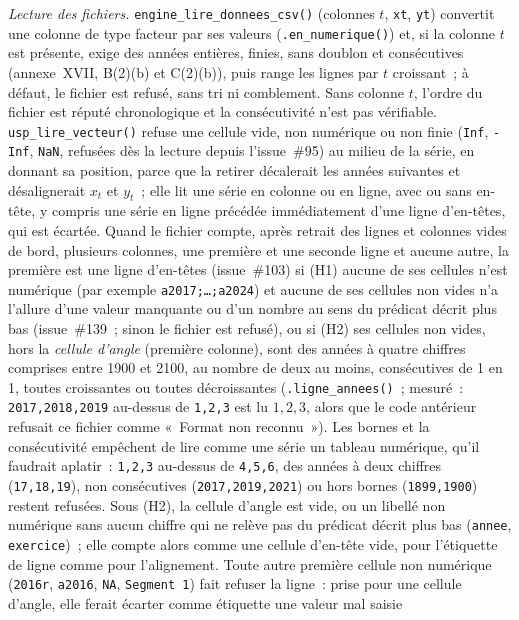 \documentclass[a4paper,11pt]{article}
\newcommand{\code}[1]{\texttt{\small #1}}
\begin{document}
\emph{Lecture des fichiers.} \code{engine\_lire\_donnees\_csv()} (colonnes $t$, \code{xt},
\code{yt}) convertit une colonne de type facteur par ses valeurs (\code{.en\_numerique()}) et,
si la colonne $t$ est présente, exige des années entières, finies, sans doublon et consécutives
(annexe~XVII, B(2)(b) et C(2)(b)), puis range les lignes par $t$ croissant~; à défaut, le
fichier est refusé, sans tri ni comblement. Sans colonne $t$, l'ordre du fichier est réputé
chronologique et la consécutivité n'est pas vérifiable. \code{usp\_lire\_vecteur()} refuse une
cellule vide, non numérique ou non finie (\code{Inf}, \code{-Inf}, \code{NaN}, refusées dès la
lecture depuis l'issue~\#95) au milieu de la série, en donnant sa position, parce que la
retirer décalerait les années suivantes et désalignerait $x_t$ et $y_t$~; elle lit une série en
colonne ou en ligne, avec ou sans en-tête, y compris une série en ligne précédée immédiatement
d'une ligne d'en-têtes, qui est écartée. Quand le fichier compte, après retrait des lignes et
colonnes vides de bord, plusieurs colonnes, une première et une seconde ligne et aucune autre,
la première est une ligne d'en-têtes
(issue~\#103) si (H1) aucune de ses cellules n'est numérique (par exemple
\code{a2017;\ldots;a2024}) et aucune de ses cellules non vides n'a l'allure d'une valeur
manquante ou d'un nombre au sens du prédicat décrit plus bas (issue~\#139~; sinon le fichier est
refusé), ou si (H2) ses cellules non vides, hors la \emph{cellule d'angle}
(première colonne), sont des années à quatre chiffres comprises entre 1900 et 2100, au nombre de
deux au moins, consécutives de 1 en 1, toutes croissantes ou toutes décroissantes
(\code{.ligne\_annees()}~; mesuré~: \code{2017,2018,2019} au-dessus de \code{1,2,3} est lu $1, 2,
3$, alors que le code antérieur refusait ce fichier comme «~Format non reconnu~»). Les bornes et
la consécutivité empêchent de lire comme une série un tableau numérique, qu'il faudrait aplatir~:
\code{1,2,3} au-dessus de \code{4,5,6}, des années à deux chiffres (\code{17,18,19}), non
consécutives (\code{2017,2019,2021}) ou hors bornes (\code{1899,1900}) restent refusées. Sous
(H2), la cellule d'angle est vide, ou un libellé non numérique sans aucun chiffre qui ne relève
pas du prédicat décrit plus bas (\code{annee}, \code{exercice})~; elle compte alors comme une
cellule d'en-tête vide, pour l'étiquette de ligne comme pour l'alignement. Toute autre première
cellule non numérique (\code{2016r}, \code{a2016}, \code{NA}, \code{Segment 1}) fait refuser la
ligne~: prise pour une cellule d'angle, elle ferait écarter comme étiquette une valeur mal saisie
\end{document}
